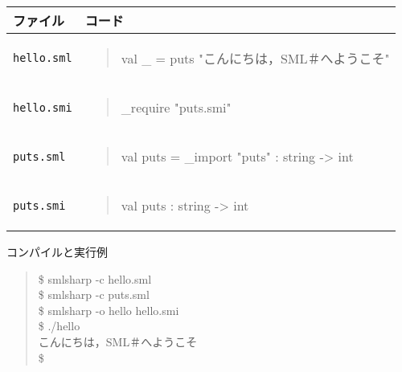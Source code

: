 \documentclass{jbook}
\newcommand{\code}[1]{\mbox{\large\tt #1}}
\newenvironment{program}{\begin{quote}\begin{tt}}%
                        {\end{tt}\end{quote}}
\begin{document}
\begin{itemize}
\begin{tabular}{|l|l|}
\hline
ファイル & コード
\\\hline
\hline
\begin{minipage}{0.5\textwidth}
\code{hello.sml}
\end{minipage}
&
\begin{minipage}{0.5\textwidth}
\begin{program}
val \_ = puts "こんにちは，SML＃へようこそ"
\end{program}
\end{minipage}
\\\hline
\begin{minipage}{0.5\textwidth}
\code{hello.smi}
\end{minipage}
&
\begin{minipage}{0.5\textwidth}
\begin{program}
\_require "puts.smi"
\end{program}
\end{minipage}
\\\hline
\begin{minipage}{0.5\textwidth}
\code{puts.sml}
\end{minipage}
&
\begin{minipage}{0.5\textwidth}
\begin{program}
val puts = \_import "puts" : string -> int
\end{program}
\end{minipage}
\\\hline
\begin{minipage}{0.5\textwidth}
\code{puts.smi}
\end{minipage}
&
\begin{minipage}{0.5\textwidth}
\begin{program}
val puts : string -> int
\end{program}
\end{minipage}
\\\hline
\end{tabular}


コンパイルと実行例
\begin{program}
 \$ smlsharp -c hello.sml\\
 \$ smlsharp -c puts.sml\\
 \$ smlsharp -o hello hello.smi\\
 \$ ./hello\\
 こんにちは，SML＃へようこそ\\
 \$
\end{program}
\end{itemize}
\end{document}
